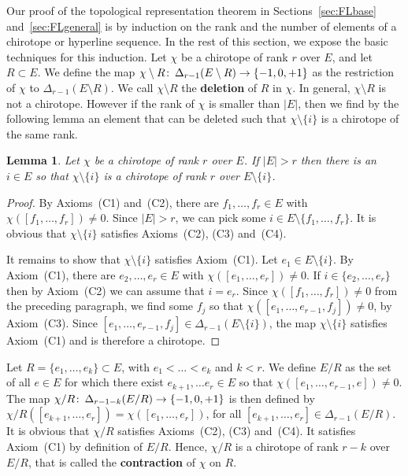 \documentclass[a4paper]{amsart}
\def\co{\colon\thinspace}
\newcommand{\begriff}[1]{\textbf{#1}}
\newtheorem{lemma}{Lemma}
\theoremstyle{definition}
\theoremstyle{remark}
\begin{document}
Our proof of the topological representation theorem in
Sections~\ref{sec:FLbase} and~\ref{sec:FLgeneral} is by induction on
the rank and the number of elements of a chirotope or hyperline
sequence.  In the rest of this section, we expose the basic techniques
for this induction.
%
Let $\chi$ be a chirotope of rank $r$ over $E$, and let $R\subset E$.
We define the map $\chi\setminus R \co \Delta_{r-1}(E\setminus R)\to
\{-1,0,+1\}$ as the restriction of $\chi$ to $\Delta_{r-1}(E\setminus
R)$. We call $\chi\setminus R$ the \begriff{deletion} of $R$ in
$\chi$.  In general, $\chi\setminus R$ is not a chirotope. However if
the rank of $\chi$ is smaller than $|E|$, then we find by the
following lemma an element that can be deleted such that $\chi
\setminus \{i\}$ is a chirotope of the same rank.
\begin{lemma}\label{lem:fullrank}
  Let $\chi$ be a chirotope of rank $r$ over $E$.  If $|E|>r$ then
  there is an $i\in E$ so that $\chi\setminus \{i\}$ is a chirotope of
  rank $r$ over $E\setminus \{i\}$.
\end{lemma}
\begin{proof}
  By Axioms~(C1) and~(C2), there are $f_1,\dots, f_r \in E$ with
  $\chi([ f_1,\dots, f_r])\not=0$. Since $|E|>r$, we can pick some
  $i\in E\setminus \{f_1,\dots,f_r\}$.
%  
  It is obvious that $\chi\setminus \{i\}$ satisfies Axioms~(C2), (C3)
  and~(C4).
  
  It remains to show that $\chi\setminus \{i\}$ satisfies Axiom~(C1).
  Let $e_1\in E\setminus \{i\}$. By Axiom~(C1), there are
  $e_2,\dots,e_r\in E$ with $\chi([ e_1,\dots, e_r])\not=0$. If
  $i\in\{e_2,\dots,e_r\}$ then by Axiom~(C2) we can assume that
  $i=e_r$.  Since $\chi([ f_1,\dots, f_r])\not=0$ from the preceding
  paragraph, we find some $f_j$ so that $\chi([ e_1,\dots, e_{r-1},
  f_j]) \not= 0$, by Axiom~(C3).
%
  Since $[ e_1,\dots, e_{r-1}, f_j] \in \Delta_{r-1}(E\setminus
  \{i\})$, the map $\chi\setminus\{i\}$ satisfies Axiom~(C1) and is
  therefore a chirotope.
\end{proof}

Let $R=\{e_1,\dots, e_k\}\subset E$, with $e_1<\dots < e_k$ and $k<r$. 
We define $E/R$ as the set of all $e \in E$ for which there exist
$e_{k+1},\dots e_{r}\in E$ so that $\chi([ e_1,\dots, 
e_{r-1},  e])\not= 0$. 
The map $\chi/R\co\Delta_{r-1-k}(E/R)\to \{-1,0,+1\}$ is then defined by 
$ \chi/R([ e_{k+1},\dots,  e_r]) = \chi([
e_1,\dots,  e_r])$, for all $[ e_{k+1},\dots,  e_r]
\in \Delta_{r-1}(E/R)$. 
%
It is obvious that $\chi/R$ satisfies Axioms~(C2), (C3) and~(C4). It
satisfies Axiom~(C1) by definition of $E/R$. Hence, $\chi/R$ is a
chirotope of rank $r-k$ over $E/R$, that is called the
\begriff{contraction} of $\chi$ on $R$. 
\end{document}
